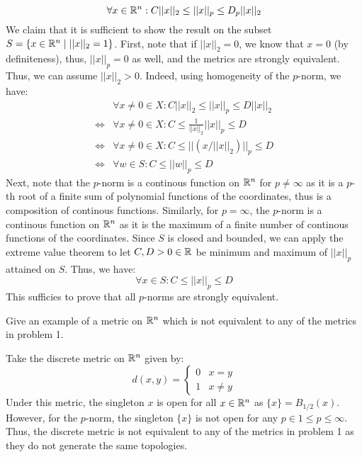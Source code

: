 \documentclass[12pt]{article}
\begin{document}
\begin{solu}
    \[ \forall x \in \mathbb R^n : C ||x||_2 \leq ||x||_p \leq D_p ||x||_2 \]
    We claim that it is sufficient to show the result on the subset $S = \{x \in \mathbb R^n \mid ||x||_2 = 1\}$. First, note that if $||x||_2 = 0$, we know that $x = 0$ (by definiteness), thus, $||x||_p = 0$ as well, and the metrics are strongly equivalent. Thus, we can assume $||x||_2 > 0$.
    Indeed, using homogeneity of the $p$-norm, we have:
    \begin{align*}
        &\forall x \neq 0 \in X: C ||x||_2 \leq ||x||_p \leq D ||x||_2 \\
        \iff &\forall x \neq 0 \in X: C \leq \frac{1}{||x||_2} ||x||_p \leq D \\
        \iff &\forall x \neq 0 \in X: C \leq  || (x/||x||_2)||_p \leq D \\
        \iff &\forall w \in S: C \leq ||w||_p \leq D
    \end{align*}
    Next, note that the $p$-norm is a continous function on $\mathbb R^n$ for $p \neq \infty$ as it is a $p$-th root of a finite sum of polynomial functions of the coordinates, thus is a composition of continous functions. Similarly, for $p = \infty$, the $p$-norm is a continous function on $\mathbb R^n$ as it is the maximum of a finite number of continous functions of the coordinates. Since $S$ is closed and bounded, we can apply the extreme value theorem to let $C, D > 0 \in \mathbb R$ be minimum and maximum of $||x||_p$ attained on $S$. Thus, we have:
    \[ \forall x \in S: C \leq ||x||_p \leq D \]
    This sufficies to prove that all $p$-norms are strongly equivalent.
\end{solu}

\newpage

\begin{problab}{2}
    Give an example of a metric on $\mathbb R^n$ which is not equivalent to any of the metrics in problem 1.
\end{problab}
\begin{solu}
    Take the discrete metric on $\mathbb R^n$ given by:
    \[ d(x,y) = \begin{cases}
        0 & x = y \\
        1 & x \neq y
    \end{cases} \]
    Under this metric, the singleton ${x}$ is open for all $x \in \mathbb R^n$ as $\{x\} = B_{1/2}(x)$. However, for the $p$-norm, the singleton $\{x\}$ is not open for any $p \in 1\leq p \leq \infty$. Thus, the discrete metric is not equivalent to any of the metrics in problem 1 as they do not generate the same topologies.
\end{solu}
\end{document}
